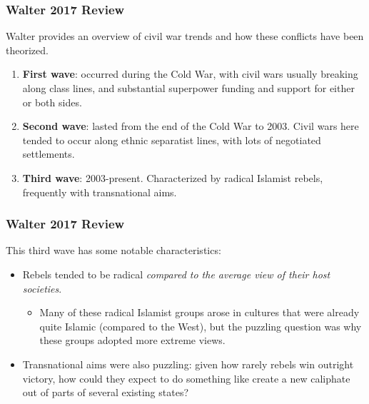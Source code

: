 \documentclass{beamer}
\begin{document}

\begin{frame} 
	\frametitle{\LARGE{Walter 2017 Review}}
Walter provides an overview of civil war trends and how these conflicts have been theorized.
	\begin{enumerate}
		\item \textbf{First wave}: occurred during the Cold War, with civil wars usually breaking along class lines, and substantial superpower funding and support for either or both sides. \pause
		\item \textbf{Second wave}: lasted from the end of the Cold War to 2003. Civil wars here tended to occur along ethnic separatist lines, with lots of negotiated settlements. \pause
		\item \textbf{Third wave}: 2003-present. Characterized by radical Islamist rebels, frequently with transnational aims.
	\end{enumerate}
\end{frame}

\begin{frame} 
	\frametitle{\LARGE{Walter 2017 Review}}
This third wave has some notable characteristics:
	\begin{itemize}
		\item Rebels tended to be radical \textit{compared to the average view of their host societies}. \pause
		\begin{itemize}
			\item Many of these radical Islamist groups arose in cultures that were already quite Islamic (compared to the West), but the puzzling question was why these groups adopted more extreme views. \pause
		\end{itemize}
	\item Transnational aims were also puzzling: given how rarely rebels win outright victory, how could they expect to do something like create a new caliphate out of parts of several existing states?
	\end{itemize}
\end{frame}
\end{document}
